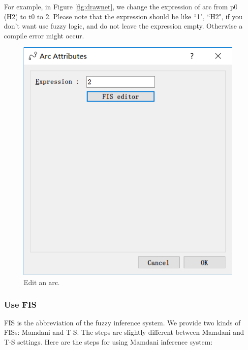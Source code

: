 \documentclass[journal,a4paper,onecolumn]{article}
\begin{document}
For example, in Figure \ref{fig:drawnet}, we change the expression of arc from p0 (H2) to t0 to 2. Please note that the expression should be like ``1", ``H2", if you don't want use fuzzy logic, and do not leave the expression empty. Otherwise a compile error might occur. 

\begin{figure}[!hbt]
	\begin{center}
		\includegraphics[width=0.8\columnwidth]{fig5}
		\caption{Edit an arc.}
		\label{fig:editarc}
	\end{center}
\end{figure}



\subsubsection{Use FIS}
FIS is the abbreviation of the fuzzy inference system. We provide two kinds of FISs: Mamdani and T-S. The steps are slightly different between Mamdani and T-S settings. Here are the steps for using Mamdani inference system: 
\end{document}
